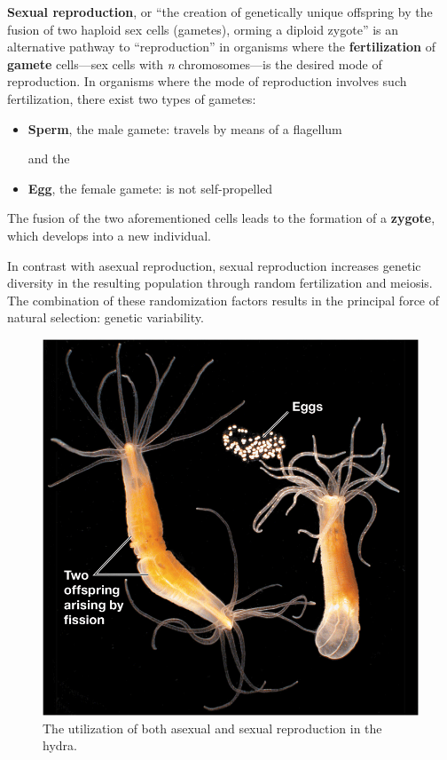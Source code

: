 \documentclass{article}
\begin{document}
\textbf{Sexual reproduction}, or ``the creation of genetically unique offspring
by the fusion of two haploid sex cells (gametes), orming a diploid zygote'' is
an alternative pathway to ``reproduction'' in organisms where the
\textbf{fertilization} of \textbf{gamete} cells---sex cells with \emph{n}
chromosomes---is the desired mode of reproduction.
In organisms where the mode of reproduction involves such fertilization, there
exist two types of gametes:

\begin{itemize}
	\item \textbf{Sperm}, the male gamete: travels by means of a flagellum

		and the

	\item \textbf{Egg}, the female gamete: is not self-propelled
\end{itemize}

The fusion of the two aforementioned cells leads to the formation of a
\textbf{zygote}, which develops into a new individual.

In contrast with asexual reproduction, sexual reproduction increases genetic
diversity in the resulting population through random fertilization and
meiosis. The combination of these randomization factors results in the
principal force of natural selection: genetic variability.

\begin{figure}
	\centering
	\includegraphics[width=0.9\linewidth]{hermaphroditism.png}
	\caption{The utilization of both asexual and sexual reproduction in the hydra.}
\end{figure}
\end{document}
